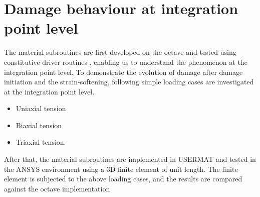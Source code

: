 \documentclass[12pt,openright,twoside]{report}
\begin{document}
\section{Damage behaviour at integration point level}
\indent\indent\indent The material subroutines are first developed on the octave and tested using constitutive driver routines \citep{codes}, enabling us to understand the phenomenon at the integration point level. To demonstrate the evolution of damage after damage initiation and the strain-softening, following simple loading cases are investigated at the integration point level.
\begin{itemize}
\item Uniaxial tension
\item Biaxial tension
\item Triaxial tension.
\end{itemize} 
After that, the material subroutines are implemented in USERMAT and tested in the ANSYS environment using a 3D finite element of unit length. The finite element is subjected to the above loading cases, and the results are compared against the octave implementation
\FloatBarrier
\end{document}
